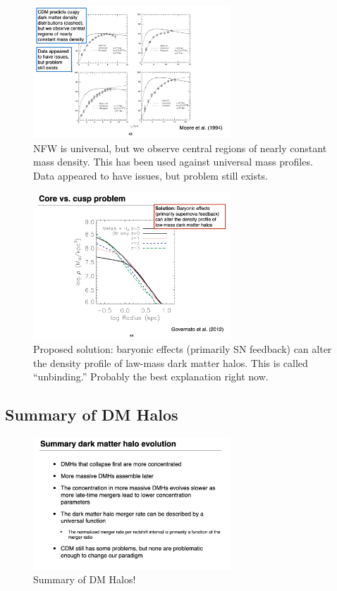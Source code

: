 \documentclass{article}
\begin{document}
\begin{figure}
    \centering
\includegraphics[width=0.66\textwidth]{figs/Screen Shot 2021-10-13 at 10.55.50 AM.png}
    \caption{NFW is universal, but we observe central regions of nearly constant mass density. This has been used against universal mass profiles. Data appeared to have issues, but problem still exists. }
    \label{fig:core_cusp1}
\end{figure}

\begin{figure}
    \centering
\includegraphics[width=0.66\textwidth]{figs/Screen Shot 2021-10-13 at 10.56.13 AM.png}
    \caption{Proposed solution: baryonic effects (primarily SN feedback) can alter the density profile of law-mass dark matter halos. This is called ``unbinding.'' Probably the best explanation right now.  }
    \label{fig:core_cusp2}
\end{figure}

\subsection{Summary of DM Halos }

\begin{figure}
    \centering
\includegraphics[width=0.66\textwidth]{figs/Screen Shot 2021-10-13 at 11.00.43 AM.png}
    \caption{Summary of DM Halos!  }
    \label{fig:DM_summary}
\end{figure}
\end{document}
